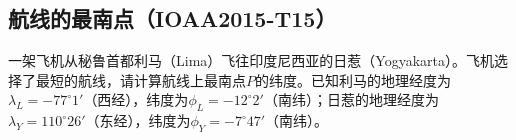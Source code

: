 \documentclass[a4paper]{article}
\begin{document}
\subsection{航线的最南点（IOAA2015-T15）}

一架飞机从秘鲁首都利马（Lima）飞往印度尼西亚的日惹（Yogyakarta）。飞机选择了最短的航线，请计算航线上最南点$P$的纬度。已知利马的地理经度为$\lambda_L = -77^\circ1'$（西经），纬度为$\phi_L = -12^\circ2'$（南纬）；日惹的地理经度为$\lambda_Y = 110^\circ26'$（东经），纬度为$\phi_Y = -7^\circ47'$（南纬）。
\bigskip

\def\RotationX{180}
\def\RotationY{0}
\def\Llon{-77.0166667}
\def\Llat{-12.0333333}
\def\Ylon{110.4333333}
\def\Ylat{-7.7833333}
\def\Plon{-162.4763889}
\def\Plat{-69.6269444}
\end{document}
